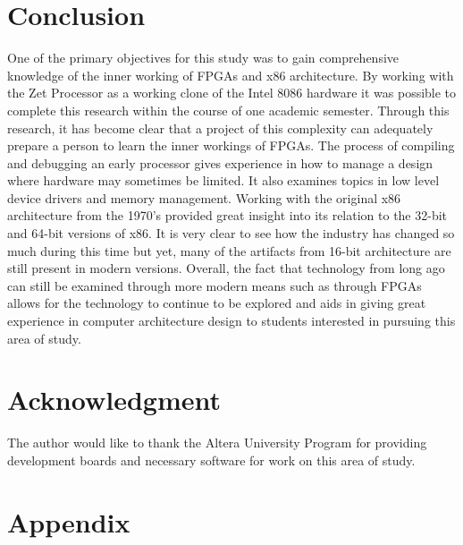 \documentclass[pdftex,10.5pt]{report}
\begin{document}
\section{Conclusion}
One of the primary objectives for this study was to gain comprehensive knowledge of the inner working of FPGAs and x86 architecture. By working with the Zet Processor as a working clone of the Intel 8086 hardware it was possible to complete this research within the course of one academic semester. Through this research, it has become clear that a project of this complexity can adequately prepare a person to learn the inner workings of FPGAs. The process of compiling and debugging an early processor gives experience in how to manage a design where hardware may sometimes be limited. It also examines topics in low level device drivers and memory management. Working with the original x86 architecture from the 1970's provided great insight into its relation to the 32-bit and 64-bit versions of x86. It is very clear to see how the industry has changed so much during this time but yet, many of the artifacts from 16-bit architecture are still present in modern versions. Overall, the fact that technology from long ago can still be examined through more modern means such as through FPGAs allows for the technology to continue to be explored and aids in giving great experience in computer architecture design to students interested in pursuing this area of study.

\section*{Acknowledgment}
The author would like to thank the Altera University Program \cite{UniProgram} for providing development boards and necessary software for work on this area of study.

\section{Appendix}

\onehalfspacing

\label{App:AppendixA}
\end{document}
